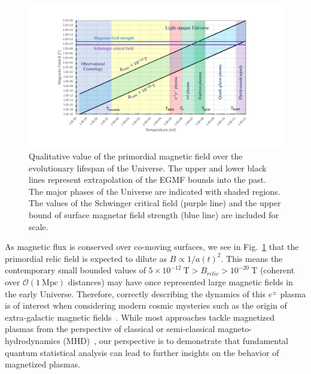 \documentclass[universe,article,submit,moreauthors,pdftex,a4paper]{Definitions/mdpi}
\newcommand*{\rf}[1]{Fig.~{\ref{#1}}}
\begin{document}
\begin{figure}[htbp]
 \centering \includegraphics[trim=110 50 120 40,clip,width=\textwidth]{./plots/relic_plot.pdf}
 \caption{Qualitative value of the primordial magnetic field over the evolutionary lifespan of the Universe. The upper and lower black lines represent extrapolation of the EGMF bounds into the past. The major phases of the Universe are indicated with shaded regions. The values of the Schwinger critical field (purple line) and the upper bound of surface magnetar field strength (blue line) are included for scale.\label{relic_plot}}
\end{figure}

As magnetic flux is conserved over co-moving surfaces, we see in \rf{relic_plot} that the primordial relic field is expected to dilute as $B\propto1/a(t)^{2}$. This means the contemporary small bounded values of $5\times10^{-12}\ \mathrm{T}>B_{relic}>10^{-20}\ \mathrm{T}$ (coherent over $\mathcal{O}(1\ \mathrm{Mpc})$ distances) may have once represented large magnetic fields in the early Universe. Therefore, correctly describing the dynamics of this $e^{\pm}$ plasma is of interest when considering modern cosmic mysteries such as the origin of extra-galactic magnetic fields~\cite{Anchordoqui:2001bs,Neronov:2010gir}. While most approaches tackle magnetized plasmas from the perspective of classical or semi-classical magneto-hydrodynamics (MHD)~\cite{berezhiani1992influence,berezhiani1995large,Schlickeiser:2018hzq}, our perspective is to demonstrate that fundamental quantum statistical analysis can lead to further insights on the behavior of magnetized plasmas.
\end{document}
